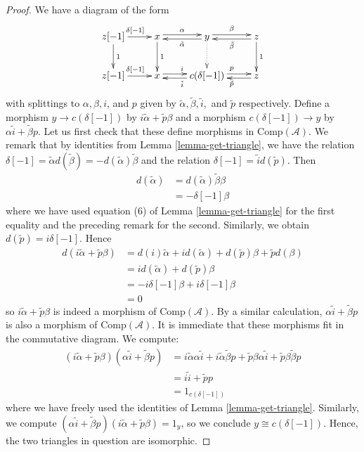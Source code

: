 \documentclass{stacks-project}
\theoremstyle{plain}
\theoremstyle{definition}
\theoremstyle{remark}
\numberwithin{equation}{subsection}
\begin{document}
\begin{proof}
We have a diagram of the form
$$
\xymatrix{
z[-1]\ar[r]^{\delta[-1]}\ar[d]^1 &
x\ar@<0.5ex>[r]^{\alpha}\ar[d]^1 &
y\ar@<0.5ex>[r]^{\beta}\ar@{.>}[d]\ar@<0.5ex>[l]^{\tilde{\alpha}} &
z\ar[d]^1\ar@<0.5ex>[l]^{\tilde\beta} \\
z[-1] \ar[r]^{\delta[-1]} &
x\ar@<0.5ex>[r]^i &
c(\delta[-1]) \ar@<0.5ex>[r]^p\ar@<0.5ex>[l]^{\tilde i} &
z\ar@<0.5ex>[l]^{\tilde p}
}
$$
with splittings to $\alpha, \beta, i$, and $p$ given by
$\tilde{\alpha}, \tilde{\beta}, \tilde{i},$ and $\tilde{p}$ respectively.
Define a morphism $y \to c(\delta[-1])$ by
$i\tilde{\alpha} + \tilde{p}\beta$ and a morphism
$c(\delta[-1]) \to y$ by $\alpha \tilde{i} + \tilde{\beta} p$.
Let us first check that these define morphisms in $\text{Comp}(\mathcal{A})$.
We remark that by identities from Lemma \ref{lemma-get-triangle},
we have the relation
$\delta[-1] = \tilde{\alpha}d(\tilde{\beta}) = -d(\tilde{\alpha})\tilde{\beta}$
and the relation $\delta[-1] = \tilde{i}d(\tilde{p})$. Then
\begin{align*}
d(\tilde{\alpha})
& =
d(\tilde{\alpha})\tilde{\beta}\beta \\
& =
-\delta[-1]\beta
\end{align*}
where we have used equation (6) of
Lemma \ref{lemma-get-triangle} for the first equality and
the preceding remark for the second. Similarly, we obtain
$d(\tilde{p}) = i\delta[-1]$. Hence
\begin{align*}
d(i\tilde{\alpha} + \tilde{p}\beta)
& =
d(i)\tilde{\alpha} + id(\tilde{\alpha}) +
d(\tilde{p})\beta + \tilde{p}d(\beta) \\
& =
id(\tilde{\alpha}) + d(\tilde{p})\beta \\
& =
-i\delta[-1]\beta + i\delta[-1]\beta \\
& =
0
\end{align*}
so $i\tilde{\alpha} + \tilde{p}\beta$ is indeed a morphism of
$\text{Comp}(\mathcal{A})$. By a similar calculation,
$\alpha \tilde{i} + \tilde{\beta} p$ is also a morphism of
$\text{Comp}(\mathcal{A})$. It is immediate that these morphisms
fit in the commutative diagram. We compute:
\begin{align*}
(i\tilde{\alpha} + \tilde{p}\beta)(\alpha \tilde{i} + \tilde{\beta} p)
& =
i\tilde{\alpha}\alpha\tilde{i} + i\tilde{\alpha}\tilde{\beta}p
+ \tilde{p}\beta\alpha\tilde{i} + \tilde{p}\beta\tilde{\beta}p \\
& =
i\tilde{i} + \tilde{p}p \\
& =
1_{c(\delta[-1])}
\end{align*}
where we have freely used the identities of
Lemma \ref{lemma-get-triangle}. Similarly, we compute
$(\alpha \tilde{i} + \tilde{\beta} p)(i\tilde{\alpha} + \tilde{p}\beta) = 1_y$,
so we conclude $y \cong c(\delta[-1])$. Hence, the two triangles in question
are isomorphic.
\end{proof}
\end{document}
